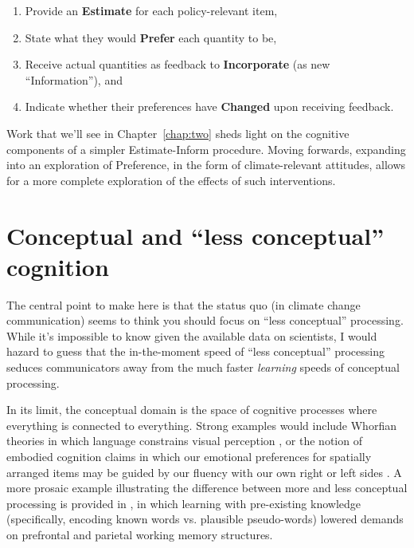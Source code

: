 \begin{enumerate}
\item Provide an \textbf{Estimate} for each policy-relevant item,
\item State what they would \textbf{Prefer} each quantity to be, 
\item Receive actual quantities as feedback to \textbf{Incorporate} (as new
``Information''), and 
\item Indicate whether their preferences have \textbf{Changed} upon receiving feedback.
\end{enumerate}

Work that we'll see in Chapter~\ref{chap:two} sheds light on the cognitive
components of a simpler Estimate-Inform procedure. Moving forwards, expanding
into an exploration of Preference, in the form of climate-relevant attitudes,
allows for a more complete exploration of the effects of such interventions.

\section{Conceptual and \texorpdfstring{``less conceptual''}{``less conceptual''} cognition}
\label{sec:two}

The central point to make here is that the status quo (in climate change
communication) seems to think you should focus on ``less conceptual''
processing. While it's impossible to know given the available data on
scientists, I would hazard to guess that the in-the-moment speed of ``less
conceptual'' processing seduces communicators away from the much faster
\emph{learning} speeds of conceptual processing.

In its limit, the conceptual domain is the space of cognitive processes where
everything is connected to everything. Strong examples would include Whorfian
theories in which language constrains visual perception
\cite{boroditsky_does_2001}, or the notion of embodied cognition claims in which
our emotional preferences for spatially arranged items may be guided by our
fluency with our own right or left sides \cite{casasanto_embodiment_2009}. A
more prosaic example illustrating the difference between more and less conceptual
processing is provided in \citeauthor{clark_assembling_2003}, in which learning with
pre-existing knowledge (specifically, encoding known words vs. plausible
pseudo-words) lowered demands on prefrontal and parietal working memory
structures.

